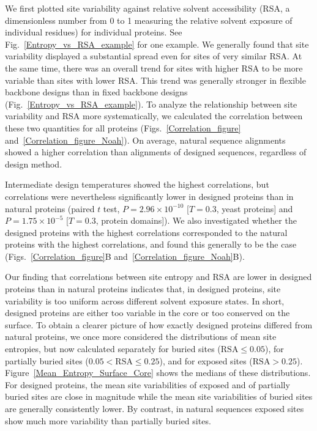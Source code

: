 \documentclass[12pt]{article}
\begin{document}
We first plotted site variability against relative solvent accessibility (RSA, a dimensionless number from 0 to 1 measuring the relative solvent exposure of individual residues) for individual proteins. See Fig.~\ref{Entropy_vs_RSA_example} for one example. We generally found that site variability displayed a substantial spread even for sites of very similar RSA. At the same time, there was an overall trend for sites with higher RSA to be more variable than sites with lower RSA. This trend was generally stronger in flexible backbone designs than in fixed backbone designs (Fig.~\ref{Entropy_vs_RSA_example}). To analyze the relationship between site variability and RSA more systematically, we calculated the correlation between these two quantities for all proteins (Figs.~\ref{Correlation_figure} and~\ref{Correlation_figure_Noah}). On average, natural sequence alignments showed a higher correlation than alignments of designed sequences, regardless of design method. 

Intermediate design temperatures showed the highest correlations, but correlations were nevertheless significantly lower in designed proteins than in natural proteins (paired $t$ test, $P=2.96\times 10^{-10}$ [$T=0.3$, yeast proteins] and $P= 1.75\times 10^{-5}$ [$T=0.3$, protein domains]).  We also investigated whether the designed proteins with the highest correlations corresponded to the natural proteins with the highest correlations, and found this generally to be the case (Figs.~\ref{Correlation_figure}B and~\ref{Correlation_figure_Noah}B).

Our finding that correlations between site entropy and RSA are lower in designed proteins than in natural proteins indicates that, in designed proteins, site variability is too uniform across different solvent exposure states. In short, designed proteins are either too variable in the core or too conserved on the surface. To obtain a clearer picture of how exactly designed proteins differed from natural proteins, we once more considered the distributions of mean site entropies, but now calculated separately for buried sites ($\text{RSA}\leq0.05$), for partially buried sites ($0.05<\text{RSA}\leq0.25$), and for exposed sites ($\text{RSA}>0.25$). Figure~\ref{Mean_Entropy_Surface_Core} shows the medians of these distributions. For designed proteins, the mean site variabilities of exposed and of partially buried sites are close in magnitude while the mean site variabilities of buried sites are generally consistently lower. By contrast, in natural sequences exposed sites show much more variability than partially buried sites.
\end{document}
